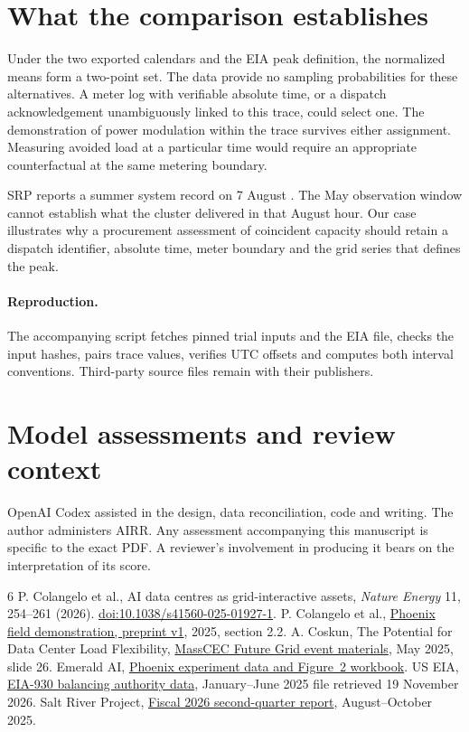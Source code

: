 \documentclass[11pt]{article}
\begin{document}
\section{What the comparison establishes}
Under the two exported calendars and the EIA peak definition, the normalized means form a two-point set. The data provide no sampling probabilities for these alternatives. A meter log with verifiable absolute time, or a dispatch acknowledgement unambiguously linked to this trace, could select one. The demonstration of power modulation within the trace survives either assignment. Measuring avoided load at a particular time would require an appropriate counterfactual at the same metering boundary.

SRP reports a summer system record on 7 August \cite{srp}. The May observation window cannot establish what the cluster delivered in that August hour. Our case illustrates why a procurement assessment of coincident capacity should retain a dispatch identifier, absolute time, meter boundary and the grid series that defines the peak.

\paragraph{Reproduction.} The accompanying script fetches pinned trial inputs and the EIA file, checks the input hashes, pairs trace values, verifies UTC offsets and computes both interval conventions. Third-party source files remain with their publishers.

\section*{Model assessments and review context}
OpenAI Codex assisted in the design, data reconciliation, code and writing. The author administers AIRR. Any assessment accompanying this manuscript is specific to the exact PDF. A reviewer's involvement in producing it bears on the interpretation of its score.
\begin{thebibliography}{6}
 P. Colangelo et al., AI data centres as grid-interactive assets, \emph{Nature Energy} 11, 254--261 (2026). \href{https://doi.org/10.1038/s41560-025-01927-1}{doi:10.1038/s41560-025-01927-1}.
 P. Colangelo et al., \href{https://arxiv.org/abs/2507.00909v1}{Phoenix field demonstration, preprint v1}, 2025, section 2.2.
 A. Coskun, The Potential for Data Center Load Flexibility, \href{https://www.masscec.com/sites/default/files/documents/transitioning_to_the_future_grid_in_ma_event_i_slides.pdf}{MassCEC Future Grid event materials}, May 2025, slide 26.
 Emerald AI, \href{https://github.com/ai-emerald/emerald-ai-demo-may-2025/tree/34403aef78c2690a8e4f0ba8f7f62d302cdba967/data}{Phoenix experiment data and Figure~2 workbook}.
 US EIA, \href{https://www.eia.gov/electricity/gridmonitor/sixMonthFiles/EIA930_BALANCE_2025_Jan_Jun.csv}{EIA-930 balancing authority data}, January--June 2025 file retrieved 19 November 2026.
 Salt River Project, \href{https://www.srpnet.com/assets/srpnet/pdf/about/QuarterlyReports26_Q2Report.pdf}{Fiscal 2026 second-quarter report}, August--October 2025.
\end{thebibliography}
\end{document}
